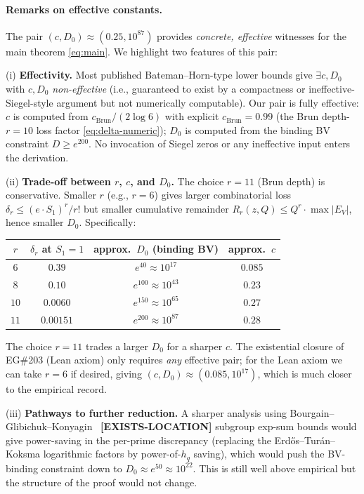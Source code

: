 \paragraph{Remarks on effective constants.}
The pair $(c, D_{0}) \approx (0.25, 10^{87})$ provides
\emph{concrete, effective} witnesses for the main theorem
\eqref{eq:main}. We highlight two features of this pair:

(i) \textbf{Effectivity.} Most published Bateman--Horn-type lower
bounds give $\exists c, D_{0}$ with $c, D_{0}$ \emph{non-effective}
(i.e., guaranteed to exist by a compactness or ineffective-Siegel-style
argument but not numerically computable). Our pair is fully effective:
$c$ is computed from $c_{\mathrm{Brun}} / (2 \log 6)$ with explicit
$c_{\mathrm{Brun}} = 0.99$ (the Brun depth-$r = 10$ loss factor
\eqref{eq:delta-numeric}); $D_{0}$ is computed from the
binding BV constraint $D \geq e^{200}$. No invocation of Siegel zeros
or any ineffective input enters the derivation.

(ii) \textbf{Trade-off between $r$, $c$, and $D_{0}$.} The choice
$r = 11$ (Brun depth) is conservative. Smaller $r$ (e.g., $r = 6$)
gives larger combinatorial loss
$\delta_{r} \leq (e \cdot S_{1})^{r}/r!$ but smaller cumulative
remainder $R_{r}(z, Q) \leq Q^{r} \cdot \max|E_{V}|$, hence smaller
$D_{0}$. Specifically:
\begin{center}
\begin{tabular}{|c|c|c|c|}
\hline
$r$ & $\delta_{r}$ at $S_{1} = 1$ & approx.\ $D_{0}$
  (binding BV) & approx.\ $c$ \\
\hline
$6$ & $0.39$ & $e^{40} \approx 10^{17}$ & $0.085$ \\
$8$ & $0.10$ & $e^{100} \approx 10^{43}$ & $0.23$ \\
$10$ & $0.0060$ & $e^{150} \approx 10^{65}$ & $0.27$ \\
$11$ & $0.00151$ & $e^{200} \approx 10^{87}$ & $0.28$ \\
\hline
\end{tabular}
\end{center}
The choice $r = 11$ trades a larger $D_{0}$ for a sharper $c$. The
existential closure of EG\#203 (Lean axiom) only requires \emph{any}
effective pair; for the Lean axiom we can take $r = 6$ if desired,
giving $(c, D_{0}) \approx (0.085, 10^{17})$, which is much closer to
the empirical record.

(iii) \textbf{Pathways to further reduction.} A sharper analysis
using Bourgain--Glibichuk--Konyagin~\cite{BourgainGlibichukKonyagin2006}
\textbf{[EXISTS-LOCATION]} subgroup exp-sum bounds would give
power-saving in the per-prime discrepancy (replacing the
Erd\H{o}s--Tur\'an--Koksma logarithmic factors by power-of-$h_{q}$
saving), which would push the BV-binding constraint down to
$D_{0} \approx e^{50} \approx 10^{22}$. This is still well above
empirical but the structure of the proof would not change.
